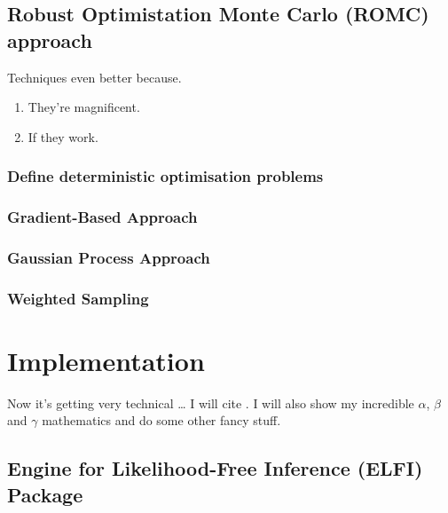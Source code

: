 \documentclass[11pt,twoside]{article}
\numberwithin{Theorem}{section}
\numberwithin{Definition}{section}
\numberwithin{Lemma}{section}
\numberwithin{Algorithm}{section}
\numberwithin{equation}{section}
\begin{document}
\subsection{Robust Optimistation Monte Carlo (ROMC) approach}
\label{sec:Techniques}

Techniques even better because.
\begin{enumerate}
 \item They're magnificent.
 \item If they work.
\end{enumerate}
\clearpage

\subsubsection{Define deterministic optimisation problems}

\subsubsection{Gradient-Based Approach}

\subsubsection{Gaussian Process Approach}

\subsubsection{Weighted Sampling}

\section{Implementation}

Now it's getting very technical \ldots{} I will cite \cite{shiina,groewe2001}. I will also show my incredible $\alpha$, $\beta$ and $\gamma$ mathematics and do some other fancy stuff.

\subsection{Engine for Likelihood-Free Inference (ELFI) Package}
\end{document}
